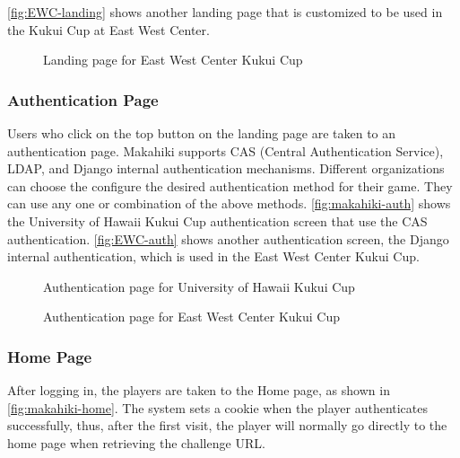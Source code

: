 \autoref{fig:EWC-landing} shows another landing page that is customized to be used in the Kukui Cup at East West Center.

\begin{figure}[!ht]
\begin{center}
\end{center}
\caption{Landing page for East West Center Kukui Cup}
\label{fig:EWC-landing}
\end{figure}

\clearpage

\subsubsection{Authentication Page}

Users who click on the top button on the landing page are taken to an authentication page. Makahiki supports CAS (Central Authentication Service), LDAP, and Django internal authentication mechanisms. Different organizations can choose the configure the desired  authentication method for their game. They can use any one or combination of the above methods. \autoref{fig:makahiki-auth} shows the University of Hawaii Kukui Cup authentication screen that use the CAS authentication. \autoref{fig:EWC-auth} shows another authentication screen, the Django internal authentication, which is used in the East West Center Kukui Cup.

\begin{figure}[!ht]
\begin{center}
\end{center}
\caption{Authentication page for University of Hawaii Kukui Cup}
\label{fig:makahiki-auth}
\end{figure}

\begin{figure}[!ht]
\begin{center}
\end{center}
\caption{Authentication page for East West Center Kukui Cup}
\label{fig:EWC-auth}
\end{figure}

\clearpage

\subsubsection{Home Page}
After logging in, the players are taken to the Home page, as shown in \autoref{fig:makahiki-home}. The system sets a cookie when the player authenticates successfully, thus, after the first visit, the player will normally go directly to the home page when retrieving the challenge URL.

